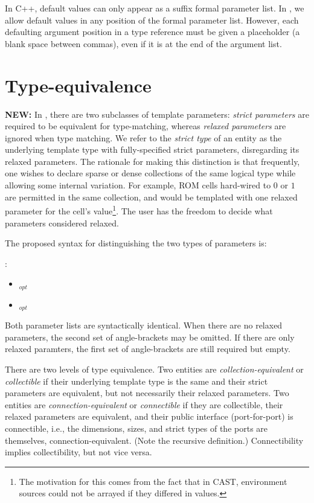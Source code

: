 In C++, default values can only appear as a suffix formal parameter list.  
In \artxx, we allow default values in any position of the formal 
parameter list.  
However, each defaulting argument position in a type reference
must be given a placeholder (a blank space between commas), 
even if it is at the end of the argument list.  


\section{Type-equivalence}
\label{sec:templates:equivalence}

\textbf{NEW:}
In \artxx, there are two subclasses of template parameters:
\emph{strict parameters} are required to be equivalent for type-matching,
whereas \emph{relaxed parameters} are ignored when type matching.  
We refer to the \emph{strict type} of an entity as the 
underlying template type with fully-specified strict parameters, 
disregarding its relaxed parameters.  
The rationale for making this distinction is that frequently, 
one wishes to declare sparse or dense collections of the same 
logical type while allowing some internal variation.  
For example, ROM cells hard-wired to $0$ or $1$ are permitted
in the same collection, and would be templated with one relaxed 
parameter for the cell's value\footnote{
The motivation for this comes from the fact that in CAST, 
environment sources could not be arrayed if they differed in values.}.
The user has the freedom to decide what parameters considered relaxed.  

The proposed syntax for distinguishing the two types of parameters is:

\medskip
\noindent
{}:
\begin{itemize}
\item {} \ttt{<} $_{opt}$ \ttt{>}
\item {} \ttt{<} $_{opt}$ \ttt{>}
	\ttt{<}  \ttt{>}
\end{itemize}
Both parameter lists are syntactically identical.  
When there are no relaxed parameters, the second set of angle-brackets
may be omitted.  
If there are only relaxed paramters, the first set of angle-brackets
are still required but empty.  


There are two levels of type equivalence.  
Two entities are \emph{collection-equivalent} or \emph{collectible}
if their underlying template type is the same and their 
strict parameters are equivalent, 
but not necessarily their relaxed parameters.  
Two entities are \emph{connection-equivalent} or \emph{connectible}
if they are collectible, their relaxed parameters are equivalent, 
and their public interface (port-for-port) is connectible, i.e., 
the dimensions, sizes, and strict types of the ports are themselves, 
connection-equivalent.  
(Note the recursive definition.)
Connectibility implies collectibility, but not vice versa.  

